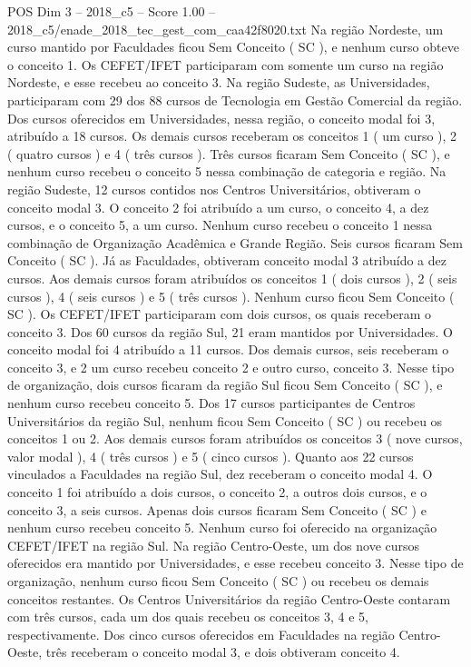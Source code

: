 \begin{textsample}{POS Dim 3 – 2018\_c5 – Score 1.00 – 2018\_c5/enade\_2018\_tec\_gest\_com\_caa42f8020.txt}
Na região Nordeste, um curso mantido por Faculdades ficou Sem Conceito ( SC ), e nenhum curso obteve o conceito 1.
Os CEFET/IFET participaram com somente um curso na região Nordeste, e esse recebeu ao conceito 3.
Na região Sudeste, as Universidades, participaram com 29 dos 88 cursos de Tecnologia em Gestão Comercial da região.
Dos cursos oferecidos em Universidades, nessa região, o conceito modal foi 3, atribuído a 18 cursos.
Os demais cursos receberam os conceitos 1 ( um curso ), 2 ( quatro cursos ) e 4 ( três cursos ).
Três cursos ficaram Sem Conceito ( SC ), e nenhum curso recebeu o conceito 5 nessa combinação de categoria e região.
Na região Sudeste, 12 cursos contidos nos Centros Universitários, obtiveram o conceito modal 3.
O conceito 2 foi atribuído a um curso, o conceito 4, a dez cursos, e o conceito 5, a um curso.
Nenhum curso recebeu o conceito 1 nessa combinação de Organização Acadêmica e Grande Região.
Seis cursos ficaram Sem Conceito ( SC ).
Já as Faculdades, obtiveram conceito modal 3 atribuído a dez cursos.
Aos demais cursos foram atribuídos os conceitos 1 ( dois cursos ), 2 ( seis cursos ), 4 ( seis cursos ) e 5 ( três cursos ).
Nenhum curso ficou Sem Conceito ( SC ).
Os CEFET/IFET participaram com dois cursos, os quais receberam o conceito 3.
Dos 60 cursos da região Sul, 21 eram mantidos por Universidades.
O conceito modal foi 4 atribuído a 11 cursos.
Dos demais cursos, seis receberam o conceito 3, e 2 um curso recebeu conceito 2 e outro curso, conceito 3.
Nesse tipo de organização, dois cursos ficaram da região Sul ficou Sem Conceito ( SC ), e nenhum curso recebeu conceito 5.
Dos 17 cursos participantes de Centros Universitários da região Sul, nenhum ficou Sem Conceito ( SC ) ou recebeu os conceitos 1 ou 2.
Aos demais cursos foram atribuídos os conceitos 3 ( nove cursos, valor modal ), 4 ( três cursos ) e 5 ( cinco cursos ).
Quanto aos 22 cursos vinculados a Faculdades na região Sul, dez receberam o conceito modal 4.
O conceito 1 foi atribuído a dois cursos, o conceito 2, a outros dois cursos, e o conceito 3, a seis cursos.
Apenas dois cursos ficaram Sem Conceito ( SC ) e nenhum curso recebeu conceito 5.
Nenhum curso foi oferecido na organização CEFET/IFET na região Sul.
Na região Centro-Oeste, um dos nove cursos oferecidos era mantido por Universidades, e esse recebeu conceito 3.
Nesse tipo de organização, nenhum curso ficou Sem Conceito ( SC ) ou recebeu os demais conceitos restantes.
Os Centros Universitários da região Centro-Oeste contaram com três cursos, cada um dos quais recebeu os conceitos 3, 4 e 5, respectivamente.
Dos cinco cursos oferecidos em Faculdades na região Centro-Oeste, três receberam o conceito modal 3, e dois obtiveram conceito 4.

\end{textsample}
